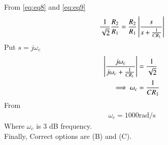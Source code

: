 \documentclass[journal,12pt,twocolumn]{IEEEtran}
\theoremstyle{remark}
\begin{document}
From \eqref{eq:eq8} and \eqref{eq:eq9}
\begin{align}
\frac{1}{\sqrt 2}\frac{R_2}{R_1}=\frac{R_2}{R_1}\left\vert\frac{s}{s+\frac{1}{CR_1}}\right\vert
\end{align}
Put $s=j\omega_c$
\begin{align}
\left\vert\frac{j\omega_c}{j\omega_c+\frac{1}{CR_1}}\right\vert&=\frac{1}{\sqrt 2}\\
\implies \omega_c &= \frac{1}{CR_1}
\end{align}
From 
\begin{align}
\omega_c= 1000 \text{rad/s}
\end{align}
Where $\omega_c$ is 3 dB frequency.\\

Finally, Correct options are (B) and (C).
\end{document}
